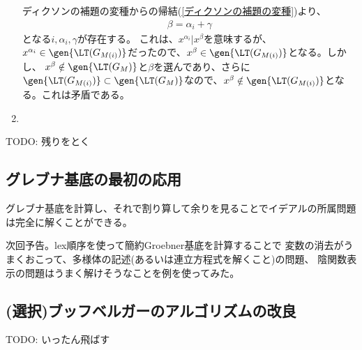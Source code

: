 \begin{enumerate}[label=(問題\arabic*)]
  ディクソンの補題の変種からの帰結(\ref{ディクソンの補題の変種})より、
  \begin{align}
    \beta = \alpha_i + \gamma
  \end{align}
  となる$i,\alpha_i,\gamma$が存在する。
  これは、$x^{\alpha_i} | x^\beta$を意味するが、$x^{\alpha_i}\in \gen{\LT(G_{M(i)})}$だったので、$x^\beta \in \gen{\LT(G_{M(i)})}$となる。しかし、
  $x^\beta \notin \gen{\LT(G_M)}$と$\beta$を選んであり、さらに
  $\gen{\LT(G_{M(i)})}\subset \gen{\LT(G_M)}$なので、$x^\beta \notin \gen{\LT(G_{M(i)})}$となる。これは矛盾である。
  \item
\end{enumerate}
TODO: 残りをとく

\subsection{グレブナ基底の最初の応用}
\label{sub:グレブナ基底の最初の応用}
グレブナ基底を計算し、それで割り算して余りを見ることでイデアルの所属問題は完全に解くことができる。

次回予告。lex順序を使って簡約Groebner基底を計算することで
変数の消去がうまくおこって、多様体の記述(あるいは連立方程式を解くこと)の問題、
陰関数表示の問題はうまく解けそうなことを例を使ってみた。

\subsection{(選択)ブッフベルガーのアルゴリズムの改良}
\label{sub:(選択)ブッフベルガーのアルゴリズムの改良}
TODO: いったん飛ばす
